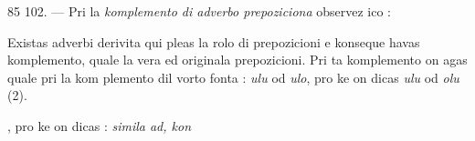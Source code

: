 \begin{VUpage}[89]{85}
\VUblanc{6.01pt}%
102. --- Pri la \textit{komplemento di adverbo prepoziciona}\nl
observez ico :

Existas adverbi derivita qui pleas la rolo di prepozicioni\nl
e konseque havas komplemento, quale la vera ed originala\nl
prepozicioni. Pri ta komplemento on agas quale pri la kom\cc
plemento dil vorto fonta :  \textit{ulu} od\nl
\textit{ulo}, pro ke on dicas  \textit{ulu} od\nl
\textit{olu} (2).

, pro ke on dicas : \textit{simila ad, kon}\cc
\end{VUpage}

